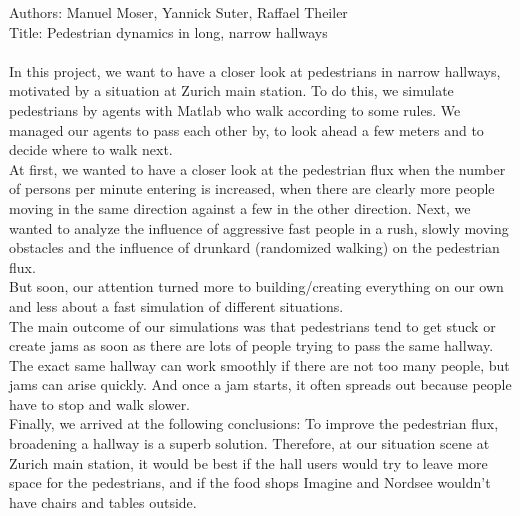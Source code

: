 
Authors: Manuel Moser, Yannick Suter, Raffael Theiler\\
Title: Pedestrian dynamics in long, narrow hallways\\
\\
In this project, we want to have a closer look at pedestrians in narrow hallways, motivated by a situation at Zurich main station. To do this, we simulate pedestrians by agents with Matlab who walk according to some rules. We managed our agents to pass each other by, to look ahead a few meters and to decide where to walk next.\\
At first, we wanted to have a closer look at the pedestrian flux when the number of persons per minute entering is increased, when there are clearly more people moving in the same direction against a few in the other direction. Next, we wanted to analyze the influence of aggressive fast people in a rush, slowly moving obstacles and the influence of drunkard (randomized walking) on the pedestrian flux.\\
But soon, our attention turned more to building/creating everything on our own and less about a fast simulation of different situations.\\
The main outcome of our simulations was that pedestrians tend to get stuck or create jams as soon as there are lots of people trying to pass the same hallway. The exact same hallway can work smoothly if there are not too many people, but jams can arise quickly. And once a jam starts, it often spreads out because people have to stop and walk slower.\\
Finally, we arrived at the following conclusions: To improve the pedestrian flux, broadening a hallway is a superb solution. Therefore, at our situation scene at Zurich main station, it would be best if the hall users would try to leave more space for the pedestrians, and if the food shops Imagine and Nordsee wouldn't have chairs and tables outside.
